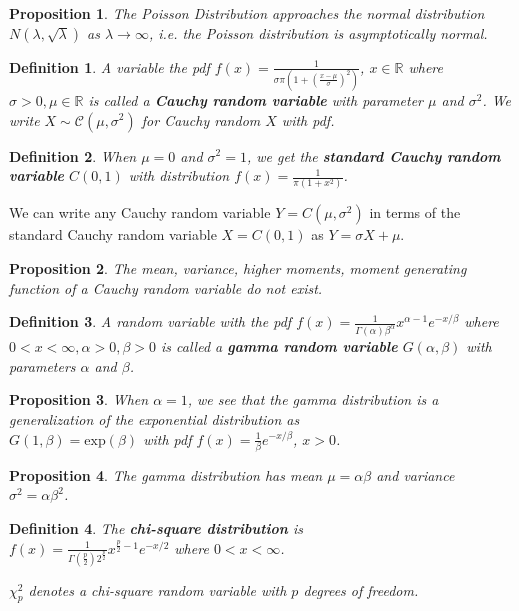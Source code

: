 \documentclass[14pt,twoside]{extreport}
\theoremstyle{dotless}
\newtheorem*{defn}{\footnotesize Definition}
\newtheorem*{prop}{\footnotesize Proposition} %
\begin{document}
\begin{prop}
    The Poisson Distribution approaches the normal distribution $N(\lambda, \sqrt{\lambda})$ as $\lambda \to \infty$, i.e. the Poisson distribution is asymptotically normal.
\end{prop}

\begin{defn}
    A variable the pdf $f(x) = \displaystyle \frac{1}{\sigma \pi (1 + \left( \frac{x - \mu}{\sigma} \right)^2 )}$, $x \in \mathbb{R}$ where $\sigma > 0, \mu \in \mathbb{R}$ is called a \textbf{Cauchy random variable} with parameter $\mu$ and $\sigma^2$.
    We write $X \sim \mathcal{C}(\mu, \sigma^2)$ for Cauchy random $X$ with pdf.
\end{defn}

\begin{defn}
    When $\mu = 0$ and $\sigma^2 = 1$, we get the \textbf{standard Cauchy random variable} $C(0,1)$ with distribution $f(x) = \displaystyle \frac{1}{\pi (1 + x^2)}$.
\end{defn}

We can write any Cauchy random variable $Y = C(\mu, \sigma^2)$ in terms of the standard Cauchy random variable $X = C(0,1)$ as $Y = \sigma X + \mu$.

\begin{prop}
The mean, variance, higher moments, moment generating function of a Cauchy random variable do not exist.
\end{prop}

\begin{defn}
    A random variable with the pdf $f(x) = \displaystyle  \frac{1}{\Gamma(\alpha) \beta^\alpha} x^{\alpha - 1} e^{-x/\beta}$ where $0 < x < \infty, \alpha > 0, \beta > 0$ is called a \textbf{gamma random variable} $G(\alpha, \beta)$ with parameters $\alpha$ and $\beta$.
\end{defn}
\begin{prop}
    When $\alpha=1$, we see that the gamma distribution is a generalization of the exponential distribution as \\
$G(1, \beta) = \text{exp}(\beta)$ with pdf $f(x) = \frac{1}{\beta} e^{-x/\beta}$, $x > 0$.
\end{prop}

\begin{prop}
The gamma distribution has mean $\mu = \alpha \beta$ and variance $\sigma^2 = \alpha \beta^2$.
\end{prop}

\begin{defn}
    The \textbf{chi-square distribution} is \\
    $f(x) = \displaystyle \frac{1}{\Gamma(\frac{p}{2}) 2^{\frac{p}{2}}} x^{\frac{p}{2} - 1} e ^{-x/2}$ where $0 < x < \infty$.

    \vspace{0.5cm}
    $\chi_p^2$ denotes a chi-square random variable with $p$ degrees of freedom.
\end{defn}
\end{document}
